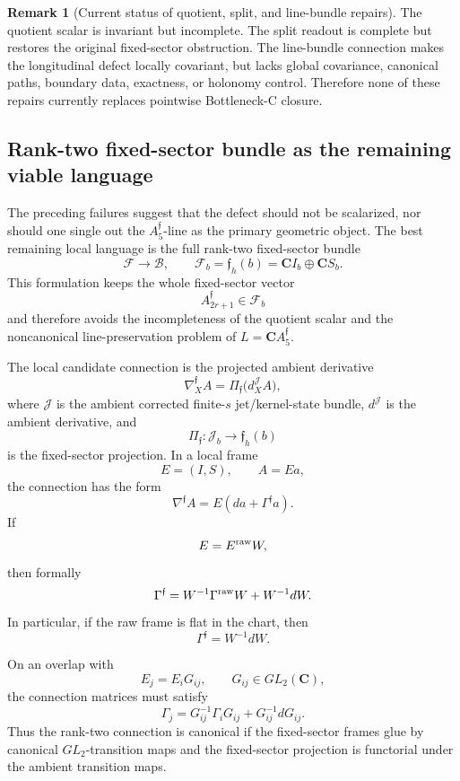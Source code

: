 \documentclass[11pt,a4paper]{amsart}
\theoremstyle{plain}
\theoremstyle{definition}
\newtheorem{remark}[theorem]{Remark}
\begin{document}
\begin{remark}[Current status of quotient, split, and line-bundle repairs]
\label{rem:current-status-quotient-split-line-repairs}
The quotient scalar is invariant but incomplete.  The split readout is complete
but restores the original fixed-sector obstruction.  The line-bundle
connection makes the longitudinal defect locally covariant, but lacks global
covariance, canonical paths, boundary data, exactness, or holonomy control.
Therefore none of these repairs currently replaces pointwise Bottleneck-C
closure.
\end{remark}

\subsection{Rank-two fixed-sector bundle as the remaining viable language}
\label{subsec:rank-two-fixed-sector-remaining-language}

The preceding failures suggest that the defect should not be scalarized, nor
should one single out the \(A_5^{\mathfrak f}\)-line as the primary geometric
object.  The best remaining local language is the full rank-two fixed-sector
bundle
\[
\mathcal F\to\mathcal B,
\qquad
\mathcal F_b=\mathfrak f_h(b)=\mathbf C I_b\oplus\mathbf C S_b.
\]
This formulation keeps the whole fixed-sector vector
\[
A_{2r+1}^{\mathfrak f}\in\mathcal F_b
\]
and therefore avoids the incompleteness of the quotient scalar and the
noncanonical line-preservation problem of \(L=\mathbf C A_5^{\mathfrak f}\).

The local candidate connection is the projected ambient derivative
\[
\nabla_X^{\mathfrak f}A
=
\Pi_{\mathfrak f}\bigl(d_X^{\mathcal J}A\bigr),
\]
where \(\mathcal J\) is the ambient corrected finite-\(s\) jet/kernel-state
bundle, \(d^{\mathcal J}\) is the ambient derivative, and
\[
\Pi_{\mathfrak f}:\mathcal J_b\to\mathfrak f_h(b)
\]
is the fixed-sector projection.  In a local frame
\[
E=(I,S),
\qquad
A=Ea,
\]
the connection has the form
\[
\nabla^{\mathfrak f}A
=
E(da+\Gamma^{\mathfrak f}a).
\]
If
\[
E=E^{\rm raw}W,
\]
then formally
\[
\Gamma^{\mathfrak f}
=
W^{-1}\Gamma^{\rm raw}W+W^{-1}dW.
\]
In particular, if the raw frame is flat in the chart, then
\[
\Gamma^{\mathfrak f}=W^{-1}dW.
\]

On an overlap with
\[
E_j=E_iG_{ij},
\qquad
G_{ij}\in GL_2(\mathbf C),
\]
the connection matrices must satisfy
\[
\Gamma_j
=
G_{ij}^{-1}\Gamma_iG_{ij}
+
G_{ij}^{-1}dG_{ij}.
\]
Thus the rank-two connection is canonical if the fixed-sector frames glue by
canonical \(GL_2\)-transition maps and the fixed-sector projection is
functorial under the ambient transition maps.
\end{document}
